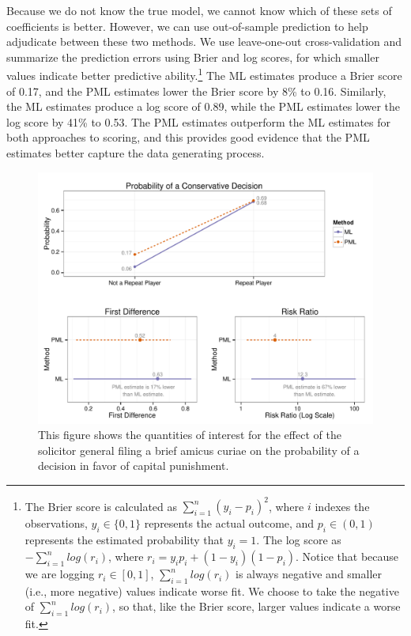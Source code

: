 \documentclass[12pt]{article}
\begin{document}
Because we do not know the true model, we cannot know which of these sets of coefficients is better.
However, we can use out-of-sample prediction to help adjudicate between these two methods.
We use leave-one-out cross-validation and summarize the prediction errors using Brier and log scores, for which smaller values indicate better predictive ability.\footnote{The Brier score is calculated as $\sum_{i = 1}^n (y_i - p_i)^2$, where $i$ indexes the observations, $y_i \in \{0, 1\}$ represents the actual outcome, and $p_i \in (0, 1)$ represents the estimated probability that $y_i = 1$.
The log score as $-\sum_{i = 1}^n log(r_i)$, where $r_i = y_i p_i + (1 - y_i)(1 - p_i)$.
Notice that because we are logging $r_i \in [0, 1]$, $\sum_{i = 1}^n log(r_i)$ is always negative and smaller (i.e., more negative) values indicate worse fit.
We choose to take the negative of $\sum_{i = 1}^n log(r_i)$, so that, like the Brier score, larger values indicate a worse fit.}
The ML estimates produce a Brier score of 0.17, and the PML estimates lower the Brier score by 8\% to 0.16.
Similarly, the ML estimates produce a log score of 0.89, while the PML estimates lower the log score by 41\% to 0.53.
The PML estimates outperform the ML estimates for both approaches to scoring, and this provides good evidence that the PML estimates better capture the data generating process.

\begin{figure}[h]
\begin{center}
\includegraphics[width = \textwidth]{figs/ge-qis.pdf}
\caption{This figure shows the quantities of interest for the effect of the solicitor general filing a brief amicus curiae on the probability of a decision in favor of capital punishment.}\label{fig:ge-qis}
\end{center}
\end{figure}
\end{document}
